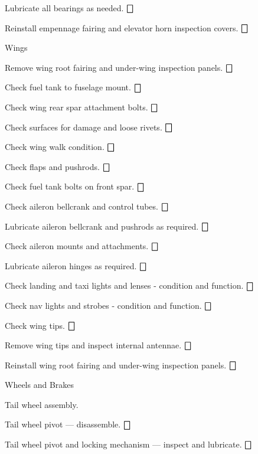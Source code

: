 \begin{enumerate*}
\begin{enumerate*}
		\item Lubricate all bearings as needed.  \dotfill $\bigbox$
		\item Reinstall empennage fairing and elevator horn inspection covers.  \dotfill $\bigbox$
	\end{enumerate*}
	\item{Wings} 
	\begin{enumerate*}
		\item Remove wing root fairing and under-wing inspection panels.  \dotfill $\bigbox$
		\item Check fuel tank to fuselage mount. \dotfill $\bigbox$
		\item Check wing rear spar attachment bolts. \dotfill $\bigbox$
		\item Check surfaces for damage and loose rivets.  \dotfill $\bigbox$
		\item Check wing walk condition. \dotfill $\bigbox$
		\item Check flaps and pushrods. \dotfill $\bigbox$
		\item Check fuel tank bolts on front spar. \dotfill $\bigbox$
		\item Check aileron bellcrank and control tubes. \dotfill $\bigbox$
		\item Lubricate aileron bellcrank and pushrods as required. \dotfill $\bigbox$
		\item Check aileron mounts and attachments. \dotfill $\bigbox$
		\item Lubricate aileron hinges as required. \dotfill $\bigbox$
		\item Check landing and taxi lights and lenses - condition and function. \dotfill $\bigbox$
		\item Check nav lights and strobes - condition and function. \dotfill $\bigbox$
		\item Check wing tips. \dotfill $\bigbox$
		\item Remove wing tips and inspect internal antennae. \dotfill $\bigbox$
		\item Reinstall wing root fairing and under-wing inspection panels.  \dotfill $\bigbox$
	\end{enumerate*}
	\item{Wheels and Brakes} 
	\begin{enumerate*}
		\item Tail wheel assembly.  
		\begin{enumerate*}
		  \item Tail wheel pivot --- disassemble. \dotfill $\bigbox$
		  \item Tail wheel pivot and locking mechanism --- inspect and lubricate. \dotfill $\bigbox$

\end{enumerate*}
\end{enumerate*}
\end{enumerate*}
